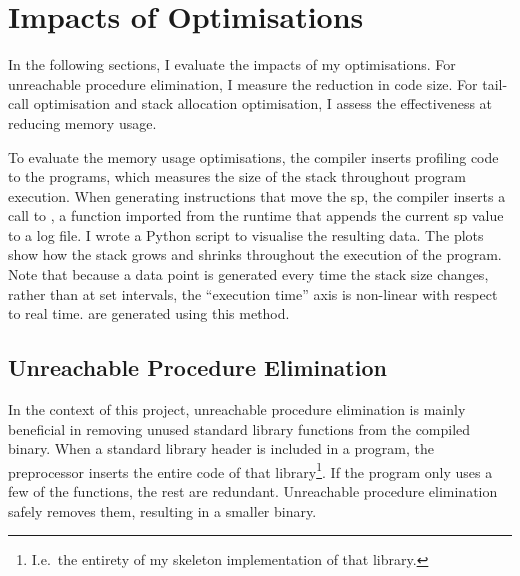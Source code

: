 \documentclass[00-main.tex]{subfiles}
\begin{document}
\section{Impacts of Optimisations}\label{sec:eval:optimisations}

In the following sections, I evaluate the impacts of my optimisations.
For unreachable procedure elimination, I measure the reduction in code size.
For tail-call optimisation and stack allocation optimisation, I assess the effectiveness at reducing memory usage.

To evaluate the memory usage optimisations, the compiler inserts profiling code to the programs, which measures the size of the stack throughout program execution.
When generating instructions that move the \acrlong{sp}, the compiler inserts a call to , a function imported from the runtime that appends the current \acrlong{sp} value to a log file.
I wrote a Python script to visualise the resulting data.
The plots show how the stack grows and shrinks throughout the execution of the program.
Note that because a data point is generated every time the stack size changes, rather than at set intervals, the ``execution time'' axis is non-linear with respect to real time.
 are generated using this method.

\subsection{Unreachable Procedure Elimination}\label{sec:eval:unreachable procedure elimination}

In the context of this project, unreachable procedure elimination is mainly beneficial in removing unused standard library functions from the compiled binary.
When a standard library header is included in a program, the preprocessor inserts the entire code of that library\footnote{I.e.~the entirety of my skeleton implementation of that library.}.
If the program only uses a few of the functions, the rest are redundant.
Unreachable procedure elimination safely removes them, resulting in a smaller binary.

\end{document}
